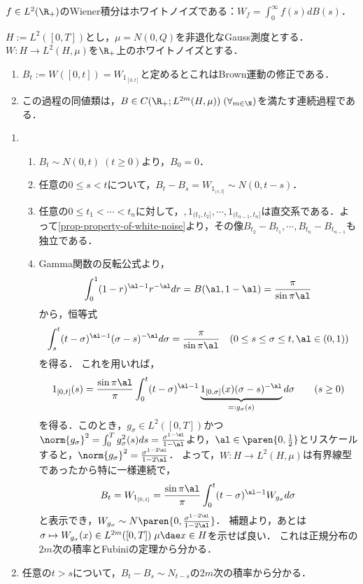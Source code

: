 \documentclass[uplatex,dvipdfmx]{jsreport}
\begin{document}
\begin{proposition}
    $f\in L^2(\R_+)$のWiener積分はホワイトノイズである：$W_f=\int^\infty_0f(s)dB(s)$．
\end{proposition}
\begin{proposition}
    $H:=L^2([0,T])$とし，$\mu=N(0,Q)$を非退化なGauss測度とする．
    $W:H\to L^2(H,\mu)$を$\R_+$上のホワイトノイズとする．
    \begin{enumerate}
        \item $B_t:=W([0,t])=W_{1_{[0,t]}}$と定めるとこれはBrown運動の修正である．
        \item この過程の同値類は，$B\in C(\R_+;L^{2m}(H,\mu))\;(\forall_{m\in\N})$を満たす連続過程である．
    \end{enumerate}
\end{proposition}
\begin{Proof}\mbox{}
    \begin{enumerate}
        \item \begin{enumerate}[({B}1)]
            \item $B_t\sim N(0,t)\;(t\ge0)$より，$B_0=0$．
            \item 任意の$0\le s<t$について，$B_t-B_s=W_{1_{(s,t]}}\sim N(0,t-s)$．
            \item 任意の$0\le t_1<\cdots<t_n$に対して，$,1_{(t_1,t_2]},\cdots,1_{(t_{n-1},t_n]}$は直交系である．よって\ref{prop-property-of-white-noise}より，その像$B_{t_2}-B_{t_1},\cdots,B_{t_n}-B_{t_{n-1}}$も独立である．
            \item Gamma関数の反転公式より，
            \[\int^1_0(1-r)^{\al-1}r^{-\al}dr=B(\al,1-\al)=\frac{\pi}{\sin\pi\al}\]
            から，恒等式
            \[\int^t_s(t-\sigma)^{\al-1}(\sigma-s)^{-\al}d\sigma=\frac{\pi}{\sin\pi\al}\quad(0\le s\le\sigma\le t,\al\in(0,1))\]
            を得る．
            これを用いれば，
            \[1_{[0,t]}(s)=\frac{\sin\pi\al}{\pi}\int^t_0(t-\sigma)^{\al-1}\underbrace{1_{[0,\sigma]}(x)(\sigma-s)^{-\al}}_{=:g_\sigma(s)}d\sigma\qquad(s\ge0)\]
            を得る．このとき，$g_\sigma\in L^2([0,T])$かつ$\norm{g_\sigma}^2=\int^T_0g_\sigma^2(s)ds=\frac{\sigma^{1-\al}}{1-\al}$より，$\al\in\paren{0,\frac{1}{2}}$とリスケールすると，$\norm{g_\sigma}^2=\frac{\sigma^{1-2\al}}{1-2\al}$．
            よって，$W:H\to L^2(H,\mu)$は有界線型であったから特に一様連続で，
            \[B_t=W_{1_{[0,t]}}=\frac{\sin\pi\al}{\pi}\int^t_0(t-\sigma)^{\al-1}W_{g_\sigma}d\sigma\]
            と表示でき，$W_{g_\sigma}\sim N\paren{0,\frac{\sigma^{1-2\al}}{1-2\al}}$．
            補題より，あとは$\sigma\mapsto W_{g_\sigma}(x)\in L^{2m}([0,T])\;\mu\dae x\in H$を示せば良い．
            これは正規分布の$2m$次の積率とFubiniの定理から分かる．
        \end{enumerate}
        \item 任意の$t>s$について，$B_t-B_s\sim N_{t-s}$の$2m$次の積率から分かる．
    \end{enumerate}
\end{Proof}
\end{document}
